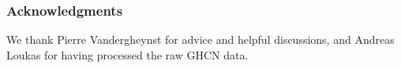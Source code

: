 \documentclass{article} %
\newcommand{\1}{\b{1}}              %
\newcommand{\0}{\b{0}}              %
\newcommand{\todo}[1]{{\color[rgb]{.6,.1,.6}{#1}}}
\begin{document}









\subsubsection*{Acknowledgments}

We thank Pierre Vandergheynst for advice and helpful discussions, and Andreas Loukas for having processed the raw GHCN data.



\end{document}
